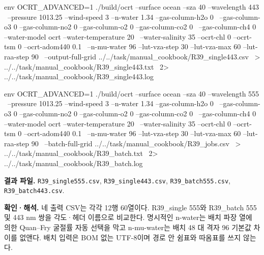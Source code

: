 \noindent\begin{minipage}{\linewidth}
\begin{ManualCode}

env OCRT_ADVANCED=1 ./build/ocrt --surface ocean --sza 40 --wavelength 443 \
  --pressure 1013.25 --wind-speed 3 --n-water 1.34 --gas-column-h2o 0 \
  --gas-column-o3 0 --gas-column-no2 0 --gas-column-o2 0 --gas-column-co2 0 \
  --gas-column-ch4 0 --water-model ocrt --water-temperature 20 \
  --water-salinity 35 --ocrt-chl 0 --ocrt-tsm 0 --ocrt-adom440 0.1 \
  --n-mu-water 96 --lut-vza-step 30 --lut-vza-max 60 --lut-raa-step 90 \
  --output-full-grid ../../task/manual_cookbook/R39_single443.csv \
  > ../../task/manual_cookbook/R39_single443.txt \
  2> ../../task/manual_cookbook/R39_single443.log

\end{ManualCode}
\end{minipage}\par

\noindent\begin{minipage}{\linewidth}
\begin{ManualCode}

env OCRT_ADVANCED=1 ./build/ocrt --surface ocean --sza 40 --wavelength 555 \
  --pressure 1013.25 --wind-speed 3 --n-water 1.34 --gas-column-h2o 0 \
  --gas-column-o3 0 --gas-column-no2 0 --gas-column-o2 0 --gas-column-co2 0 \
  --gas-column-ch4 0 --water-model ocrt --water-temperature 20 \
  --water-salinity 35 --ocrt-chl 0 --ocrt-tsm 0 --ocrt-adom440 0.1 \
  --n-mu-water 96 --lut-vza-step 30 --lut-vza-max 60 --lut-raa-step 90 \
  --batch-full-grid ../../task/manual_cookbook/R39_jobs.csv \
  > ../../task/manual_cookbook/R39_batch.txt \
  2> ../../task/manual_cookbook/R39_batch.log

\end{ManualCode}
\end{minipage}\par

\textbf{결과 파일. }\texttt{R39\_\allowbreak{}single555.csv}, \texttt{R39\_\allowbreak{}single443.csv}, \texttt{R39\_\allowbreak{}batch555.csv}, \texttt{R39\_\allowbreak{}batch443.csv}.

\textbf{확인·해석. }네 출력 CSV는 각각 12행 60열이다. R39\_single 555와 R39\_batch 555 및 443 nm 쌍을 각도·헤더 이름으로 비교한다. 명시적인 n-water는 배치 파장 열에 의한 Quan–Fry 굴절률 자동 선택을 막고 n-mu-water는 배치 48 대 격자 96 기본값 차이를 없앤다. 배치 입력은 BOM 없는 UTF-8이며 경로 안 쉼표와 따옴표를 쓰지 않는다.

